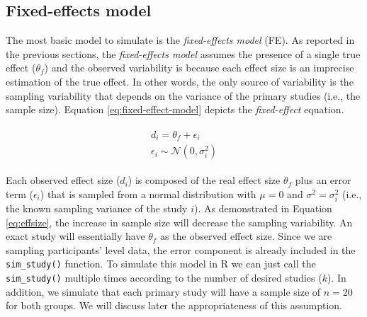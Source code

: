 \documentclass[
  man,floatsintext]{apa6}
\begin{document}
\normalsize

\hypertarget{fixed-effects-model}{%
\subsection{Fixed-effects model}\label{fixed-effects-model}}

The most basic model to simulate is the \emph{fixed-effects model} (FE). As reported in the previous sections, the \emph{fixed-effects model} assumes the presence of a single true effect (\(\theta_{f}\)) and the observed variability is because each effect size is an imprecise estimation of the true effect. In other words, the only source of variability is the sampling variability that depends on the variance of the primary studies
(i.e., the sample size). Equation \eqref{eq:fixed-effect-model} depicts the \emph{fixed-effect} equation.

\begin{align}
\begin{gathered}
d_i = \theta_f + \epsilon_i \\
\epsilon_i \sim \mathcal{N}(0,\sigma^2_i)
\label{eq:fixed-effect-model}
\end{gathered}
\end{align}

Each observed effect size (\(d_{i}\)) is composed of the real effect size \(\theta_{f}\) plus an error term (\(\epsilon_{i}\)) that is sampled from a normal distribution with \(\mu = 0\) and \(\sigma^{2} = \sigma_{i}^{2}\) (i.e., the known sampling variance of the study \(i\)). As demonstrated in
Equation \eqref{eq:effsize}, the increase in sample size will decrease the sampling variability. An exact study will essentially have \(\theta_{f}\) as the observed effect size. Since we are sampling participants' level data, the error component is already included in the \texttt{sim\_study()} function. To simulate this model in R we can just call the \texttt{sim\_study()} multiple times according to the number of desired studies (\(k\)). In addition, we simulate that each primary study will have a sample size of \(n = 20\) for both groups. We will discuss later the appropriateness of this assumption.

\scriptsize
\end{document}
